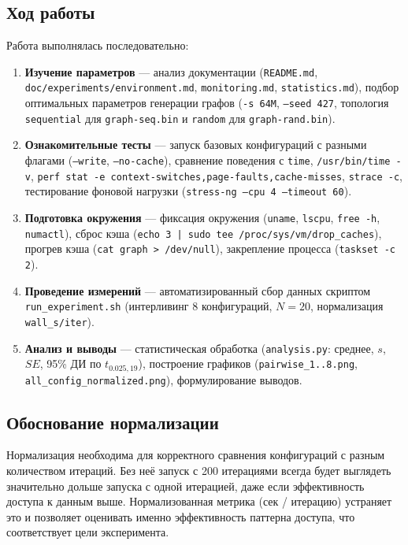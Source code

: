 \documentclass[12pt,a4paper]{article}
\begin{document}
\subsection{Ход работы}
Работа выполнялась последовательно:
\begin{enumerate}
    \item \textbf{Изучение параметров} — анализ документации (\texttt{README.md}, \texttt{doc/experiments/environment.md}, \texttt{monitoring.md}, \texttt{statistics.md}), подбор оптимальных параметров генерации графов (\texttt{-s 64M}, \texttt{--seed 427}, топология \texttt{sequential} для \texttt{graph-seq.bin} и \texttt{random} для \texttt{graph-rand.bin}).
    \item \textbf{Ознакомительные тесты} — запуск базовых конфигураций с разными флагами (\texttt{--write}, \texttt{--no-cache}), сравнение поведения с \texttt{time}, \texttt{/usr/bin/time -v}, \texttt{perf stat -e context-switches,page-faults,cache-misses}, \texttt{strace -c}, тестирование фоновой нагрузки (\texttt{stress-ng --cpu 4 --timeout 60}).
    \item \textbf{Подготовка окружения} — фиксация окружения (\texttt{uname}, \texttt{lscpu}, \texttt{free -h}, \texttt{numactl}), сброс кэша (\texttt{echo 3 | sudo tee /proc/sys/vm/drop_caches}), прогрев кэша (\texttt{cat graph > /dev/null}), закрепление процесса (\texttt{taskset -c 2}).
    \item \textbf{Проведение измерений} — автоматизированный сбор данных скриптом \texttt{run\_experiment.sh} (интерливинг 8 конфигураций, $N=20$, нормализация \texttt{wall\_s/iter}).
    \item \textbf{Анализ и выводы} — статистическая обработка (\texttt{analysis.py}: среднее, $s$, $SE$, 95\% ДИ по $t_{0.025,19}$), построение графиков (\texttt{pairwise\_1..8.png}, \texttt{all\_config\_normalized.png}), формулирование выводов.
\end{enumerate}

\subsection{Обоснование нормализации}
Нормализация необходима для корректного сравнения конфигураций с разным количеством итераций. Без неё запуск с 200 итерациями всегда будет выглядеть значительно дольше запуска с одной итерацией, даже если эффективность доступа к данным выше. Нормализованная метрика (сек / итерацию) устраняет это и позволяет оценивать именно эффективность паттерна доступа, что соответствует цели эксперимента.
\end{document}

